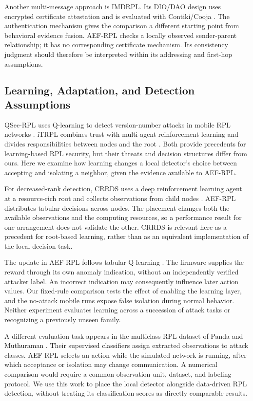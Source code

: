 \documentclass[journal]{IEEEtran}
\begin{document}
Another multi-message approach is IMDRPL. Its DIO/DAO design uses encrypted certificate attestation and is evaluated with Contiki/Cooja \cite{imdrpl2023}. The authentication mechanism gives the comparison a different starting point from behavioral evidence fusion. AEF-RPL checks a locally observed sender-parent relationship; it has no corresponding certificate mechanism. Its consistency judgment should therefore be interpreted within its addressing and first-hop assumptions.

\subsection{Learning, Adaptation, and Detection Assumptions}
QSec-RPL uses Q-learning to detect version-number attacks in mobile RPL networks \cite{qsecrpl2023}. iTRPL combines trust with multi-agent reinforcement learning and divides responsibilities between nodes and the root \cite{itrpl2024}. Both provide precedents for learning-based RPL security, but their threats and decision structures differ from ours. Here we examine how learning changes a local detector's choice between accepting and isolating a neighbor, given the evidence available to AEF-RPL.

For decreased-rank detection, CRRDS uses a deep reinforcement learning agent at a resource-rich root and collects observations from child nodes \cite{haqdad2026}. AEF-RPL distributes tabular decisions across nodes. The placement changes both the available observations and the computing resources, so a performance result for one arrangement does not validate the other. CRRDS is relevant here as a precedent for root-based learning, rather than as an equivalent implementation of the local decision task.

The update in AEF-RPL follows tabular Q-learning \cite{watkins1992}. The firmware supplies the reward through its own anomaly indication, without an independently verified attacker label. An incorrect indication may consequently influence later action values. Our fixed-rule comparison tests the effect of enabling the learning layer, and the no-attack mobile runs expose false isolation during normal behavior. Neither experiment evaluates learning across a succession of attack tasks or recognizing a previously unseen family.

A different evaluation task appears in the multiclass RPL dataset of Panda and Muthuraman \cite{panda2026}. Their supervised classifiers assign extracted observations to attack classes. AEF-RPL selects an action while the simulated network is running, after which acceptance or isolation may change communication. A numerical comparison would require a common observation unit, dataset, and labeling protocol. We use this work to place the local detector alongside data-driven RPL detection, without treating its classification scores as directly comparable results.
\end{document}
